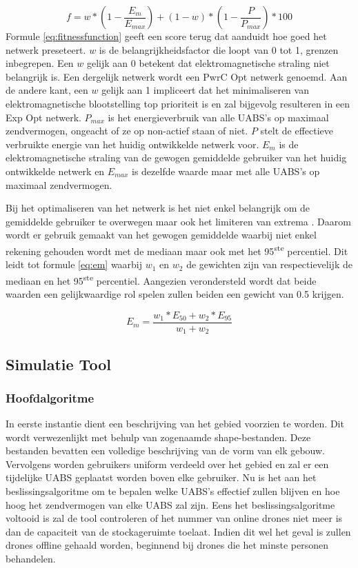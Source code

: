 \documentclass[twocolumn]{phdsymp_dutch}
\begin{document}
\begin{equation} 
f = w * \left(1 - \frac{E_m}{E_{max}}\right) + (1 - w)*\left(1 - \frac{P}{P_{max}}\right) * 100
\label{eq:fitnessfunction}
\end{equation}
\newline
Formule \ref{eq:fitnessfunction} geeft een score terug dat aanduidt hoe goed het netwerk preseteert.
$w$ is de belangrijkheidsfactor die loopt van 0 tot 1, grenzen inbegrepen. Een $w$ gelijk aan 0 betekent
dat elektromagnetische straling niet belangrijk is. Een dergelijk netwerk wordt een \gls{PwrC Opt} netwerk genoemd.
Aan de andere kant, een $w$ gelijk aan 1 impliceert dat het minimaliseren van elektromagnetische blootstelling top prioriteit is
en zal bijgevolg resulteren in een \gls{Exp Opt} netwerk. $P_{max}$ is het energieverbruik van alle \gls{UABS}'s op maximaal 
zendvermogen, ongeacht of ze 
op non-actief staan of niet.
$P$ stelt de effectieve verbruikte energie van het huidig ontwikkelde netwerk voor.
$E_m$ is de elektromagnetische straling van de gewogen gemiddelde gebruiker van het huidig ontwikkelde netwerk en 
$E_{max}$ is dezelfde waarde maar met alle \gls{UABS}'s op maximaal zendvermogen.

Bij het optimaliseren van het netwerk is het niet enkel belangrijk om  de gemiddelde gebruiker te overwegen maar ook het limiteren 
van extrema \cite{J1}. 
Daarom wordt er gebruik gemaakt van het gewogen gemiddelde waarbij niet enkel rekening gehouden wordt met de mediaan maar ook 
met het 95\textsuperscript{ste} percentiel. Dit leidt tot formule \ref{eq:em} waarbij 
  $w_1$ en  $w_2$ de gewichten zijn van respectievelijk de mediaan en het 95\textsuperscript{ste} percentiel.
 Aangezien verondersteld wordt dat beide waarden een gelijkwaardige rol spelen zullen beiden een gewicht van 0.5 krijgen. 

\begin{equation} 
E_m = \frac{w_1 * E_{50} + w_2 * E_{95}}{w_1 + w_2}
\label{eq:em}
\end{equation}
\newline
\subsection{Simulatie Tool}

\subsubsection{Hoofdalgoritme}
In eerste instantie dient een beschrijving van het gebied voorzien te worden. Dit wordt verwezenlijkt met behulp van 
zogenaamde shape-bestanden. Deze bestanden bevatten een volledige beschrijving van de vorm van elk gebouw. Vervolgens 
worden gebruikers uniform verdeeld over het gebied en zal er een tijdelijke \gls{UABS} geplaatst worden boven elke gebruiker.
Nu is het aan het beslissingsalgoritme om te bepalen welke \gls{UABS}'s effectief zullen blijven en hoe hoog het zendvermogen van elke \gls{UABS}
zal zijn. Eens het beslissingsalgoritme voltooid is zal de tool controleren of het nummer van online drones niet meer is dan 
de capaciteit van de stockageruimte toelaat. Indien dit wel het geval is zullen drones offline gehaald worden, beginnend bij 
drones die het minste personen behandelen.
\end{document}
